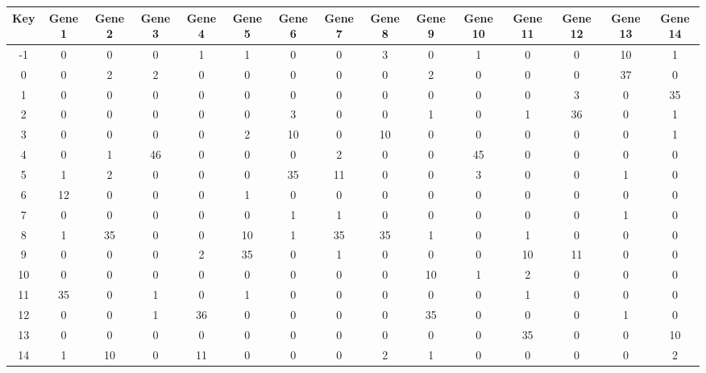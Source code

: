 \begin{tabular}{|c|c|c|c|c|c|c|c|c|c|c|c|c|c|c|}
\hline
Key & Gene 1 & Gene 2 & Gene 3 & Gene 4 & Gene 5 & Gene 6 & Gene 7 & Gene 8 & Gene 9 & Gene 10 & Gene 11 & Gene 12 & Gene 13 & Gene 14 \\
\hline
-1 & 0 & 0 & 0 & 1 & 1 & 0 & 0 & 3 & 0 & 1 & 0 & 0 & 10 & 1 \\
0 & 0 & 2 & 2 & 0 & 0 & 0 & 0 & 0 & 2 & 0 & 0 & 0 & 37 & 0 \\
1 & 0 & 0 & 0 & 0 & 0 & 0 & 0 & 0 & 0 & 0 & 0 & 3 & 0 & 35 \\
2 & 0 & 0 & 0 & 0 & 0 & 3 & 0 & 0 & 1 & 0 & 1 & 36 & 0 & 1 \\
3 & 0 & 0 & 0 & 0 & 2 & 10 & 0 & 10 & 0 & 0 & 0 & 0 & 0 & 1 \\
4 & 0 & 1 & 46 & 0 & 0 & 0 & 2 & 0 & 0 & 45 & 0 & 0 & 0 & 0 \\
5 & 1 & 2 & 0 & 0 & 0 & 35 & 11 & 0 & 0 & 3 & 0 & 0 & 1 & 0 \\
6 & 12 & 0 & 0 & 0 & 1 & 0 & 0 & 0 & 0 & 0 & 0 & 0 & 0 & 0 \\
7 & 0 & 0 & 0 & 0 & 0 & 1 & 1 & 0 & 0 & 0 & 0 & 0 & 1 & 0 \\
8 & 1 & 35 & 0 & 0 & 10 & 1 & 35 & 35 & 1 & 0 & 1 & 0 & 0 & 0 \\
9 & 0 & 0 & 0 & 2 & 35 & 0 & 1 & 0 & 0 & 0 & 10 & 11 & 0 & 0 \\
10 & 0 & 0 & 0 & 0 & 0 & 0 & 0 & 0 & 10 & 1 & 2 & 0 & 0 & 0 \\
11 & 35 & 0 & 1 & 0 & 1 & 0 & 0 & 0 & 0 & 0 & 1 & 0 & 0 & 0 \\
12 & 0 & 0 & 1 & 36 & 0 & 0 & 0 & 0 & 35 & 0 & 0 & 0 & 1 & 0 \\
13 & 0 & 0 & 0 & 0 & 0 & 0 & 0 & 0 & 0 & 0 & 35 & 0 & 0 & 10 \\
14 & 1 & 10 & 0 & 11 & 0 & 0 & 0 & 2 & 1 & 0 & 0 & 0 & 0 & 2 \\
\hline
\end{tabular}
